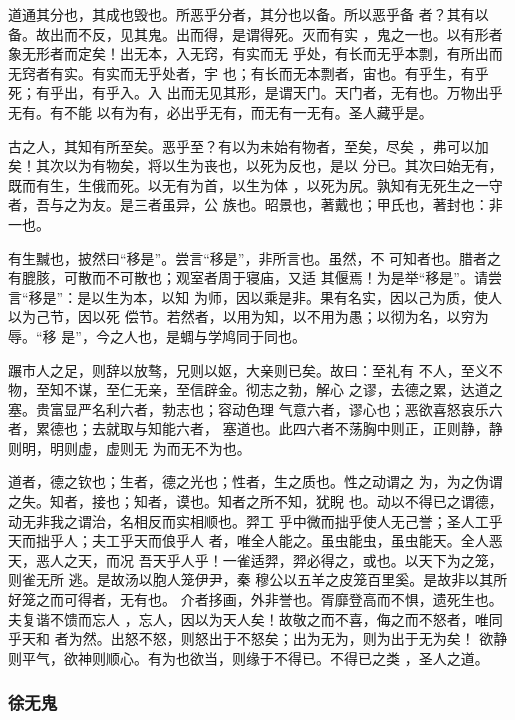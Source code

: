 \documentclass[]{article}
\begin{document}
道通其分也，其成也毁也。所恶乎分者，其分也以备。所以恶乎备
者？其有以备。故出而不反，见其鬼。出而得，是谓得死。灭而有实
，鬼之一也。以有形者象无形者而定矣！出无本，入无窍，有实而无
乎处，有长而无乎本剽，有所出而无窍者有实。有实而无乎处者，宇
也；有长而无本剽者，宙也。有乎生，有乎死；有乎出，有乎入。入
出而无见其形，是谓天门。天门者，无有也。万物出乎无有。有不能
以有为有，必出乎无有，而无有一无有。圣人藏乎是。

古之人，其知有所至矣。恶乎至？有以为未始有物者，至矣，尽矣
，弗可以加矣！其次以为有物矣，将以生为丧也，以死为反也，是以
分已。其次曰始无有，既而有生，生俄而死。以无有为首，以生为体
，以死为尻。孰知有无死生之一守者，吾与之为友。是三者虽异，公
族也。昭景也，著戴也；甲氏也，著封也：非一也。

有生黬也，披然曰``移是''。尝言``移是''，非所言也。虽然，不
可知者也。腊者之有膍胲，可散而不可散也；观室者周于寝庙，又适
其偃焉！为是举``移是''。请尝言``移是''：是以生为本，以知
为师，因以乘是非。果有名实，因以己为质，使人以为己节，因以死
偿节。若然者，以用为知，以不用为愚；以彻为名，以穷为辱。``移
是''，今之人也，是蜩与学鸠同于同也。

蹍市人之足，则辞以放骜，兄则以妪，大亲则已矣。故曰：至礼有
不人，至义不物，至知不谋，至仁无亲，至信辟金。彻志之勃，解心
之谬，去德之累，达道之塞。贵富显严名利六者，勃志也；容动色理
气意六者，谬心也；恶欲喜怒哀乐六者，累德也；去就取与知能六者，
塞道也。此四六者不荡胸中则正，正则静，静则明，明则虚，虚则无
为而无不为也。

道者，德之钦也；生者，德之光也；性者，生之质也。性之动谓之
为，为之伪谓之失。知者，接也；知者，谟也。知者之所不知，犹睨
也。动以不得已之谓德，动无非我之谓治，名相反而实相顺也。羿工
乎中微而拙乎使人无己誉；圣人工乎天而拙乎人；夫工乎天而俍乎人
者，唯全人能之。虽虫能虫，虽虫能天。全人恶天，恶人之天，而况
吾天乎人乎！一雀适羿，羿必得之，或也。以天下为之笼，则雀无所
逃。是故汤以胞人笼伊尹，秦
穆公以五羊之皮笼百里奚。是故非以其所好笼之而可得者，无有也。
介者拸画，外非誉也。胥靡登高而不惧，遗死生也。夫复谐不馈而忘人
，忘人，因以为天人矣！故敬之而不喜，侮之而不怒者，唯同乎天和
者为然。出怒不怒，则怒出于不怒矣；出为无为，则为出于无为矣！
欲静则平气，欲神则顺心。有为也欲当，则缘于不得已。不得已之类
，圣人之道。

\hypertarget{header-n2300}{%
\subsubsection{徐无鬼}\label{header-n2300}}
\end{document}
